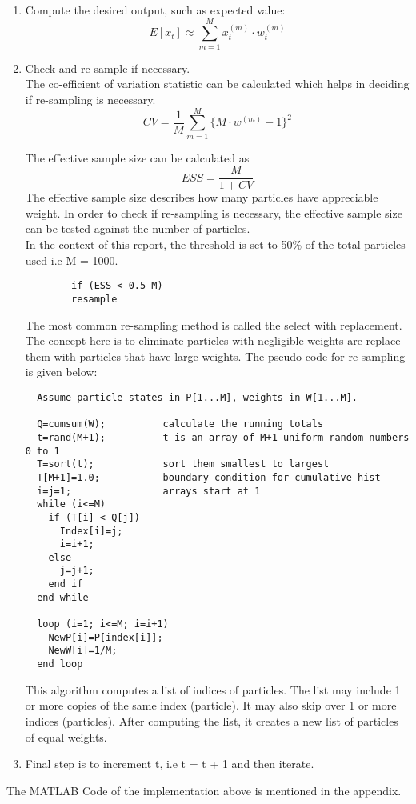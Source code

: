 \documentclass[12pt]{article}
\begin{document}
\begin{enumerate}
	\item Compute the desired output, such as expected value:
	\begin{equation}
		E[x_t] \approx \sum_{m=1}^M x_t^{(m)} \cdot w_t^{(m)}
		\label{eq:exp}
	\end{equation}
	
	\item Check and re-sample if necessary.\\
	 The co-efficient of variation statistic can be calculated which helps in deciding if re-sampling is necessary. \\
	\begin{equation}
		CV = \frac{1}{M} \sum_{m=1}^{M}\lbrace M \cdot w^{(m)} - 1 \rbrace ^ 2
		\label{eq:CV}
	\end{equation} 
	
	The effective sample size can be calculated as 
	\begin{equation}
		ESS = \frac{M}{1 + CV}
		\label{eq:ESS}
	\end{equation}
	The effective sample size describes how many particles have appreciable weight. In order to check if re-sampling is necessary, the effective sample size can be tested against the number of particles. \\
	In the context of this report, the threshold is set to 50\% of the total particles used i.e M = 1000.
	\begin{verbatim}
  		if (ESS < 0.5 M)
    	resample
	\end{verbatim}	
	
	The most common re-sampling method is called the select with replacement. The concept here is to eliminate particles with negligible weights are replace them with particles that have large weights. The pseudo code for re-sampling is given below:
\begin{verbatim}
  Assume particle states in P[1...M], weights in W[1...M].

  Q=cumsum(W);          calculate the running totals  
  t=rand(M+1);          t is an array of M+1 uniform random numbers 0 to 1
  T=sort(t);            sort them smallest to largest
  T[M+1]=1.0;           boundary condition for cumulative hist
  i=j=1;                arrays start at 1
  while (i<=M)
    if (T[i] < Q[j])
      Index[i]=j;
      i=i+1;
    else
      j=j+1;
    end if
  end while

  loop (i=1; i<=M; i=i+1)
    NewP[i]=P[index[i]];
    NewW[i]=1/M;
  end loop
\end{verbatim}
	This algorithm computes a list of indices of particles. The list may include 1 or more copies of the same index (particle). It may also skip over 1 or more indices (particles). After computing the list, it creates a new list of particles of equal weights. \\
	
	\item Final step is to increment t, i.e t = t + 1 and then iterate.
\end{enumerate}
The MATLAB Code of the implementation above is mentioned in the appendix.
\end{document}
